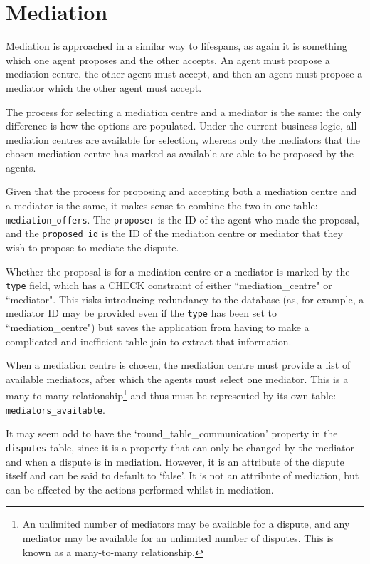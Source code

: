 \section{Mediation}

Mediation is approached in a similar way to lifespans, as again it is something which one agent proposes and the other accepts. An agent must propose a mediation centre, the other agent must accept, and then an agent must propose a mediator which the other agent must accept.

The process for selecting a mediation centre and a mediator is the same: the only difference is how the options are populated. Under the current business logic, all mediation centres are available for selection, whereas only the mediators that the chosen mediation centre has marked as available are able to be proposed by the agents.

Given that the process for proposing and accepting both a mediation centre and a mediator is the same, it makes sense to combine the two in one table: \lstinline{mediation_offers}. The \lstinline{proposer} is the ID of the agent who made the proposal, and the \lstinline{proposed_id} is the ID of the mediation centre or mediator that they wish to propose to mediate the dispute.

Whether the proposal is for a mediation centre or a mediator is marked by the \lstinline{type} field, which has a CHECK constraint of either ``mediation\_centre" or ``mediator". This risks introducing redundancy to the database (as, for example, a mediator ID may be provided even if the \lstinline{type} has been set to ``mediation\_centre") but saves the application from having to make a complicated and inefficient table-join to extract that information.

When a mediation centre is chosen, the mediation centre must provide a list of available mediators, after which the agents must select one mediator. This is a many-to-many relationship\footnote{An unlimited number of mediators may be available for a dispute, and any mediator may be available for an unlimited number of disputes. This is known as a many-to-many relationship.} and thus must be represented by its own table: \lstinline{mediators_available}.

It may seem odd to have the `round\_table\_communication' property in the \lstinline{disputes} table, since it is a property that can only be changed by the mediator and when a dispute is in mediation. However, it is an attribute of the dispute itself and can be said to default to `false'. It is not an attribute of mediation, but can be affected by the actions performed whilst in mediation.

